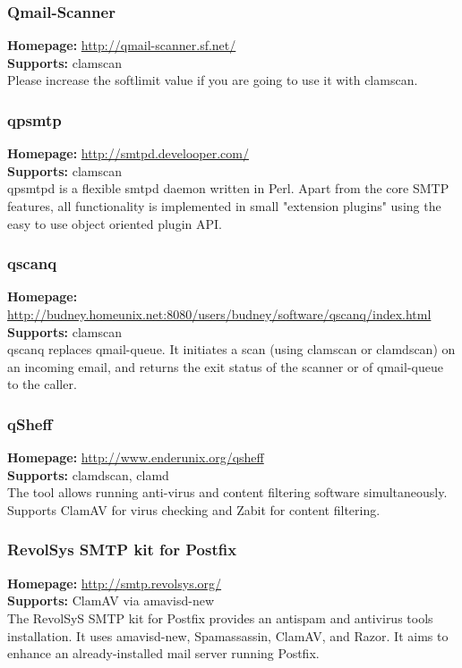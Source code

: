 \documentclass[a4paper,titlepage,12pt]{article}
\begin{document}
    \subsubsection{Qmail-Scanner}
    \textbf{Homepage:} \url{http://qmail-scanner.sf.net/}\\
    \textbf{Supports:} clamscan\\[4pt]
    Please increase the softlimit value if you are going to use it with
    clamscan.

    \subsubsection{qpsmtp}
    \textbf{Homepage:} \url{http://smtpd.develooper.com/}\\
    \textbf{Supports:} clamscan\\[4pt]
    qpsmtpd is a flexible smtpd daemon written in Perl. Apart from the core
    SMTP features, all functionality is implemented in small "extension plugins"
    using the easy to use object oriented plugin API.

    \subsubsection{qscanq}
    \textbf{Homepage:} \url{http://budney.homeunix.net:8080/users/budney/software/qscanq/index.html}\\
    \textbf{Supports:} clamscan\\[4pt]
    qscanq replaces qmail-queue. It initiates a scan (using clamscan or
    clamdscan) on an incoming email, and returns the exit status of the
    scanner or of qmail-queue to the caller.

    \subsubsection{qSheff}
    \textbf{Homepage:} \url{http://www.enderunix.org/qsheff}\\
    \textbf{Supports:} clamdscan, clamd\\[4pt]
    The tool allows running anti-virus and content filtering software
    simultaneously. Supports ClamAV for virus checking and Zabit for
    content filtering.

    \subsubsection{RevolSys SMTP kit for Postfix}
    \textbf{Homepage:} \url{http://smtp.revolsys.org/}\\
    \textbf{Supports:} ClamAV via amavisd-new\\[4pt]
    The RevolSyS SMTP kit for Postfix provides an antispam and antivirus
    tools installation. It uses amavisd-new, Spamassassin, ClamAV, and Razor.
    It aims to enhance an already-installed mail server running Postfix.
\end{document}
